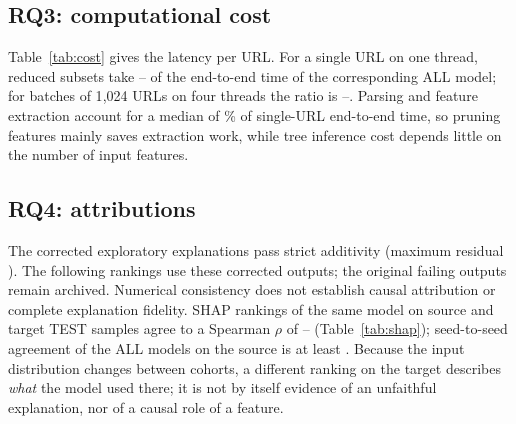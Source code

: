 \begin{table}[t]
\caption{Paired domain-cluster bootstrap contrasts of target-TEST F1 ( replicates; same resampled domains for both arms and all seeds). Top: the four primary contrasts; bottom: secondary cross-dataset contrasts. Per-seed deltas for seeds 17/29/43.}
\label{tab:contrasts}
\centering\scriptsize

\end{table}

\subsection{RQ3: computational cost}
Table~\ref{tab:cost} gives the latency per URL. For a single URL on one thread, reduced subsets take -- of the end-to-end time of the corresponding ALL model; for batches of 1{,}024 URLs on four threads the ratio is --. Parsing and feature extraction account for a median of \% of single-URL end-to-end time, so pruning features mainly saves extraction work, while tree inference cost depends little on the number of input features.

\begin{table}[t]
\caption{Cost of the seed-17 model of every configuration (median $\mu$s per URL; ``rel.'' = end-to-end time relative to ALL of the same source and classifier). Hardware: ,  GB RAM, Python .}
\label{tab:cost}
\centering\scriptsize

\end{table}

\subsection{RQ4: attributions}
The corrected exploratory explanations pass strict additivity (maximum residual ). The following rankings use these corrected outputs; the original failing outputs remain archived. Numerical consistency does not establish causal attribution or complete explanation fidelity.
SHAP rankings of the same model on source and target TEST samples agree to a Spearman $\rho$ of -- (Table~\ref{tab:shap}); seed-to-seed agreement of the ALL models on the source is at least . Because the input distribution changes between cohorts, a different ranking on the target describes \emph{what} the model used there; it is not by itself evidence of an unfaithful explanation, nor of a causal role of a feature.

